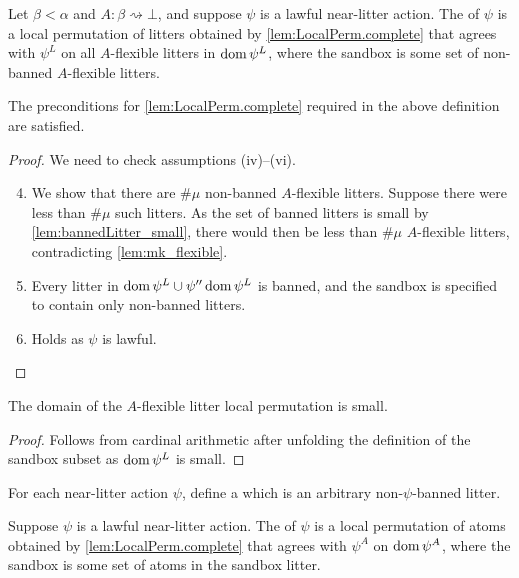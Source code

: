 \begin{definition}
    Let \( \beta < \alpha \) and \( A : \beta \rightsquigarrow \bot \), and suppose \( \psi \) is a lawful near-litter action.
    The  of \( \psi \) is a local permutation of litters obtained by \cref{lem:LocalPerm.complete} that agrees with \( \psi^L \) on all \( A \)-flexible litters in \( \operatorname{dom} \psi^L \), where the sandbox is some set of non-banned \( A \)-flexible litters.
\end{definition}
\begin{lemma}
    The preconditions for \cref{lem:LocalPerm.complete} required in the above definition are satisfied.
\end{lemma}
\begin{proof}
    We need to check assumptions (iv)--(vi).
    \begin{enumerate}
        \setcounter{enumi}{3}
        \item We show that there are \( \#\mu \) non-banned \( A \)-flexible litters.
        Suppose there were less than \( \#\mu \) such litters.
        As the set of banned litters is small by \cref{lem:bannedLitter_small}, there would then be less than \( \#\mu \) \( A \)-flexible litters, contradicting \cref{lem:mk_flexible}.
        \item Every litter in \( \operatorname{dom} \psi^L \cup \psi '' \operatorname{dom} \psi^L \) is banned, and the sandbox is specified to contain only non-banned litters.
        \item Holds as \( \psi \) is lawful.
    \end{enumerate}
\end{proof}
\begin{lemma}
    \label{lem:dom_flexibleLitterLocalPerm_small}
    The domain of the \( A \)-flexible litter local permutation is small.
\end{lemma}
\begin{proof}
    Follows from cardinal arithmetic after unfolding the definition of the sandbox subset as \( \operatorname{dom} \psi^L \) is small.
\end{proof}
\begin{definition}
    For each near-litter action \( \psi \), define a  which is an arbitrary non-\( \psi \)-banned litter.
\end{definition}
\begin{definition}
    Suppose \( \psi \) is a lawful near-litter action.
    The  of \( \psi \) is a local permutation of atoms obtained by \cref{lem:LocalPerm.complete} that agrees with \( \psi^A \) on \( \operatorname{dom} \psi^A \), where the sandbox is some set of atoms in the sandbox litter.
\end{definition}
